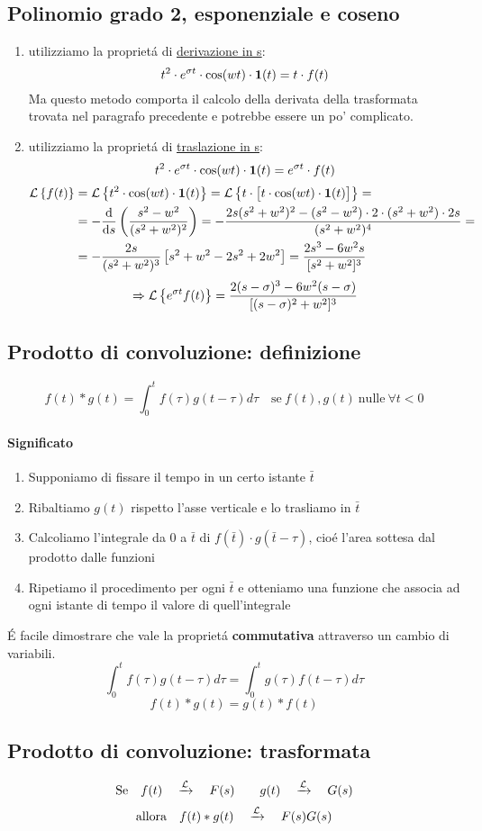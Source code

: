 \documentclass[../main.tex]{subfiles}
\begin{document}
	\subsection{Polinomio grado 2, esponenziale e coseno}
		\begin{enumerate}
			\item
				utilizziamo la propriet\'{a} di \hyperref[sec:deriv_s]{derivazione in s}:
				\[
					t^2 \cdot e^{\sigma t} \cdot \cos(wt) \cdot \textbf{1}(t) = t \cdot f(t)
				\]
				Ma questo metodo comporta il calcolo della derivata della trasformata trovata nel paragrafo precedente e potrebbe essere un po' complicato.
			\item
				utilizziamo la propriet\'{a} di \hyperref[sec:trasl_s]{traslazione in s}:
				\[
					t^2 \cdot e^{\sigma t} \cdot \cos(wt) \cdot \textbf{1}(t) = e^{\sigma t} \cdot f(t)
				\]
				\begin{align*}
					\mathcal{L} \left\lbrace f(t) \right\rbrace &= \mathcal{L} \left\lbrace t^2 \cdot \cos(wt) \cdot \textbf{1}(t) \right\rbrace = \mathcal{L} \left\lbrace t \cdot \big[ t \cdot \cos(wt) \cdot \textbf{1}(t) \big] \right\rbrace =
					\\
					&= -\frac{\mathrm{d} }{\mathrm{d} s} \left( \frac{s^2-w^2}{(s^2+w^2)^2} \right) = -\frac{2s(s^2+w^2)^2 - (s^2-w^2) \cdot 2 \cdot (s^2+w^2) \cdot 2s}{(s^2+w^2)^4} =
					\\ 
					&= -\frac{2s}{(s^2+w^2)^3} \left[ s^2+w^2-2s^2+2w^2 \right] = \frac{2s^3-6w^2s}{[s^2+w^2]^3}
				\end{align*}
				\[
					\Rightarrow \mathcal{L} \left\lbrace e^{\sigma t} f(t) \right\rbrace = \frac{2(s-\sigma)^3-6w^2(s-\sigma)}{[(s-\sigma)^2+w^2]^3}
				\]
		\end{enumerate}
	
	\subsection{Prodotto di convoluzione: definizione}
		\begin{equation}
			f(t) * g(t) = \int_{0}^{t} f(\tau)g(t-\tau) d\tau \quad \text{se}\ f(t), g(t)\ \text{nulle}\ \forall t < 0
		\end{equation}
		\paragraph{Significato}
		\begin{enumerate}
			\item Supponiamo di fissare il tempo in un certo istante $\bar{t}$
			\item Ribaltiamo $g(t)$ rispetto l'asse verticale e lo trasliamo in $\bar{t}$
			\item Calcoliamo l'integrale da 0 a $\bar{t}$ di $f(\bar{t}) \cdot g(\bar{t}-\tau)$, cio\'{e} l'area sottesa dal prodotto dalle funzioni
			\item Ripetiamo il procedimento per ogni $\bar{t}$ e otteniamo una funzione che associa ad ogni istante di tempo il valore di quell'integrale
		\end{enumerate}
		\'{E} facile dimostrare che vale la propriet\'{a} \textbf{commutativa} attraverso un cambio di variabili. \label{conv_comm}
		$$ \int_{0}^{t} f(\tau)g(t-\tau) d\tau = \int_{0}^{t} g(\tau)f(t-\tau) d\tau $$
		$$ f(t)*g(t) = g(t)*f(t) $$
		\subsection{Prodotto di convoluzione: trasformata}
		$$ \text{Se} \quad f(t) \quad \xrightarrow{\mathcal{L}} \quad F(s) \qquad g(t) \quad \xrightarrow{\mathcal{L}} \quad G(s) $$
		$$ \text{allora} \quad f(t)*g(t) \quad \xrightarrow{\mathcal{L}} \quad F(s)G(s) $$
\end{document}
